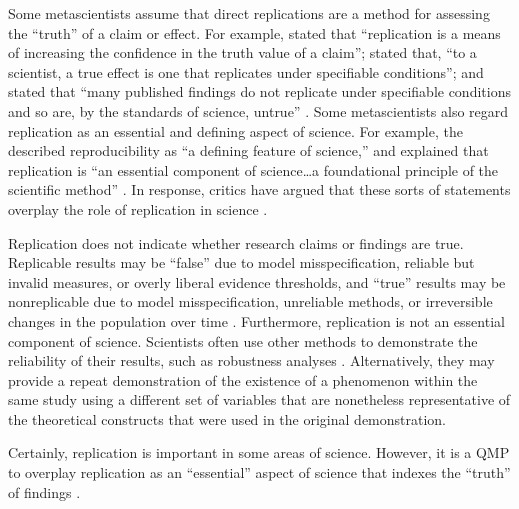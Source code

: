 \documentclass[authordate, meta]{jote-new-article}
\begin{document}
Some metascientists assume that direct replications are a method for assessing the “truth” of a claim or effect. For example, \textcite[p. 617]{Nosek2012} stated that “replication is a means of increasing the confidence in the truth value of a claim”; \textcite[p. 520]{Nelson2018} stated that, “to a scientist, a true effect is one that replicates under specifiable conditions”; and \textcite[p. 153]{Simmons2021} stated that “many published findings do not replicate under specifiable conditions and so are, by the standards of science, untrue” \parencites[for further examples, see][pp. 6-8]{Devezer2021}. Some metascientists also regard replication as an essential\emph{ }and\emph{ }defining aspect of science. For example, the \textcite[p. 1]{Collaboration2015} described reproducibility as “a defining feature of science,” and \textcite[p. 13]{Zwaan2018} explained that replication is “an essential component of science…a foundational principle of the scientific method” \parencites[see also][p. 108]{Asendorpf2013}[p. 48]{Chambers2017}[p. 618]{Nosek2012}[for further examples, see][p. 64]{Drummond2019}[p. 226]{Haig2022}[p. 487]{Maxwell2015}. In response, critics have argued that these sorts of statements overplay the role of replication in science \parencites{Boeck2018}{Devezer2019}{Devezer2021}{Feest2019}{Greenfield2017}{Guttinger2020}{Haig2022}{Iso-Ahola2020}{Leonelli2018}{Norton2015}.



Replication does not indicate whether research claims or findings are true. Replicable results may be “false” due to model misspecification, reliable but invalid measures, or overly liberal evidence thresholds, and “true” results may be nonreplicable due to model misspecification, unreliable methods, or irreversible changes in the population over time \parencites{Bak-Coleman2022}{Buzbas2023}{Boeck2018}{Devezer2019}{Devezer2021}{Errington2021b}{Guttinger2020}{Iso-Ahola2020}{Norton2015}[p. 739]{Nosek2022}{Rubin2021a}{Stanley2014}. Furthermore, replication is not an essential component of science. Scientists often use other methods to demonstrate the reliability of their results, such as robustness analyses \parencites{Haig2022}{Leonelli2018}. Alternatively, they may provide a repeat demonstration of the existence of a phenomenon within the same study using a different set of variables that are nonetheless representative of the theoretical constructs that were used in the original demonstration.



Certainly, replication is important in some areas of science. However, it is a QMP to overplay replication as an “essential” aspect of science that indexes the “truth” of findings \parencites[p. 10]{Devezer2021}.
\end{document}

